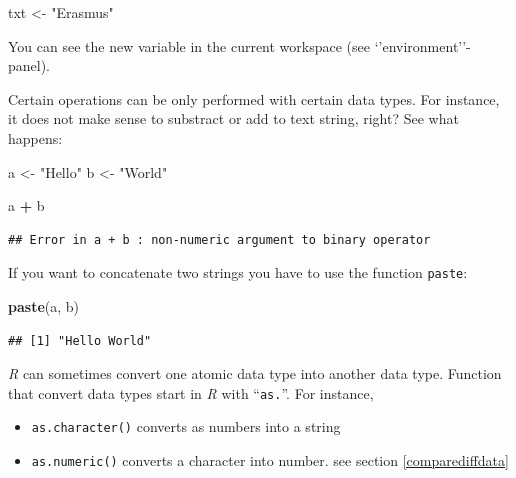 \documentclass[
]{scrartcl}
\makeatletter
\newenvironment{Shaded}{\begin{snugshade}}{\end{snugshade}}
\newcommand{\FunctionTok}[1]{\textcolor[rgb]{0.13,0.29,0.53}{\textbf{#1}}}
\newcommand{\NormalTok}[1]{#1}
\newcommand{\OtherTok}[1]{\textcolor[rgb]{0.56,0.35,0.01}{#1}}
\newcommand{\SpecialCharTok}[1]{\textcolor[rgb]{0.81,0.36,0.00}{\textbf{#1}}}
\newcommand{\StringTok}[1]{\textcolor[rgb]{0.31,0.60,0.02}{#1}}
\providecommand{\tightlist}{%
  \setlength{\itemsep}{0pt}\setlength{\parskip}{0pt}}
\newenvironment{kframe}{%
\medskip{}
\setlength{\fboxsep}{.8em}
 \def\at@end@of@kframe{}%
 \ifinner\ifhmode%
  \def\at@end@of@kframe{\end{minipage}}%
  \begin{minipage}{\columnwidth}%
 \fi\fi%
 \def\FrameCommand##1{\hskip\@totalleftmargin \hskip-\fboxsep
 \colorbox{shadecolor}{##1}\hskip-\fboxsep
     \hskip-\linewidth \hskip-\@totalleftmargin \hskip\columnwidth}%
 \MakeFramed {\advance\hsize-\width
   \@totalleftmargin\z@ \linewidth\hsize
   \@setminipage}}%
 {\par\unskip\endMakeFramed%
 \at@end@of@kframe}
\newenvironment{rmdblock}[1]
  {
  \begin{itemize}
  \renewcommand{\labelitemi}{
    \raisebox{-.7\height}[0pt][0pt]{
      {\setkeys{Gin}{width=3em,keepaspectratio}\texttt{[image: images/\#1]}}
    }
  }
  \setlength{\fboxsep}{1em}
  \begin{kframe}
  \item
  }
  {
  \end{kframe}
  \end{itemize}
  }
\newenvironment{important}
    {\begin{rmdblock}{hint}}
    {\end{rmdblock}}
\makeatother
\begin{document}
\begin{Shaded}
\begin{Highlighting}[]
\NormalTok{txt }\OtherTok{\textless{}{-}} \StringTok{"Erasmus"}
\end{Highlighting}
\end{Shaded}

You can see the new variable in the current workspace (see `'environment''-panel).

Certain operations can be only performed with certain data types. For instance,
it does not make sense to substract or add to text string, right? See what happens:

\begin{Shaded}
\begin{Highlighting}[]
\NormalTok{a }\OtherTok{\textless{}{-}} \StringTok{"Hello"}
\NormalTok{b }\OtherTok{\textless{}{-}} \StringTok{"World"}
\end{Highlighting}
\end{Shaded}

\begin{Shaded}
\begin{Highlighting}[]
\NormalTok{a }\SpecialCharTok{+}\NormalTok{ b}
\end{Highlighting}
\end{Shaded}

\begin{verbatim}
## Error in a + b : non-numeric argument to binary operator
\end{verbatim}

If you want to concatenate two strings you have to use the function \texttt{paste}:

\begin{Shaded}
\begin{Highlighting}[]
\FunctionTok{paste}\NormalTok{(a, b)}
\end{Highlighting}
\end{Shaded}

\begin{verbatim}
## [1] "Hello World"
\end{verbatim}

\begin{important}
\emph{R} can sometimes convert one atomic data type into another data
type. Function that convert data types start in \emph{R} with
``\texttt{as.}''. For instance,

\begin{itemize}
\tightlist
\item
  \texttt{as.character()} converts as numbers into a string
\item
  \texttt{as.numeric()} converts a character into number. see section
  \ref{comparediffdata}
\end{itemize}
\end{important}
\end{document}
